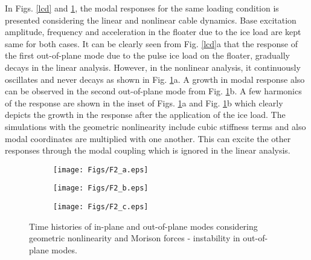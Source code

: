 \documentclass[review]{elsarticle}
\begin{document}
In Figs. \ref{lcd} and \ref{nlcd_M}, the modal responses for the same loading condition is presented considering the linear and nonlinear cable dynamics. Base excitation amplitude, frequency and acceleration in the floater due to the ice load are kept same for both cases. It can be clearly seen from Fig. \ref{lcd}a that the response of the first out-of-plane mode due to the pulse ice load on the floater, gradually decays in the linear analysis. However, in the nonlinear analysis, it continuously oscillates and never decays as shown in Fig. \ref{nlcd_M}a. A growth in modal response also can be observed in the second out-of-plane mode from Fig. \ref{nlcd_M}b. A few harmonics of the response are shown in the inset of Figs. \ref{nlcd_M}a and Fig. \ref{nlcd_M}b which clearly depicts the growth in the response after the application of the ice load. The simulations with the geometric nonlinearity include cubic stiffness terms and also modal coordinates are multiplied with one another. This can excite the other responses through the modal coupling which is ignored in the linear analysis.
\begin{figure}
	\centering
	\begin{subfigure}{1.0\textwidth}
		\centering
		\texttt{[image: Figs/F2\_a.eps]}
		\caption{}
	\end{subfigure}
	\begin{subfigure}{1.0\textwidth}
		\centering
		\texttt{[image: Figs/F2\_b.eps]}
		\caption{}
	\end{subfigure}
	\begin{subfigure}{1.0\textwidth}
		\centering
		\texttt{[image: Figs/F2\_c.eps]}
		\caption{}
	\end{subfigure}
	\caption{Time histories of in-plane and out-of-plane modes considering geometric nonlinearity and Morison forces - instability in out-of-plane modes.}
	\label{nlcd_M}
\end{figure} 
\end{document}
